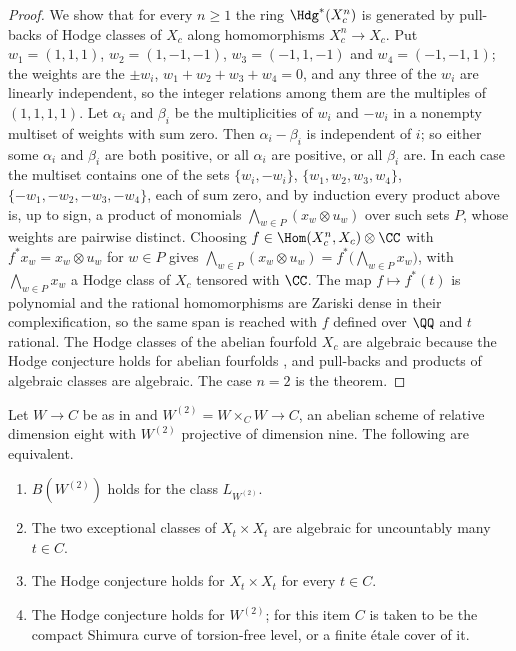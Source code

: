 \begin{proof}
We show that for every $n\ge1$ the ring $\Hdg^{*}(X_{c}^{n})$ is generated by
pull-backs of Hodge classes of $X_{c}$ along homomorphisms $X_{c}^{n}\to
X_{c}$. Put $w_{1}=(1,1,1)$, $w_{2}=(1,-1,-1)$, $w_{3}=(-1,1,-1)$ and
$w_{4}=(-1,-1,1)$; the weights are the $\pm w_{i}$,
$w_{1}+w_{2}+w_{3}+w_{4}=0$, and any three of the $w_{i}$ are linearly
independent, so the integer relations among them are the multiples of
$(1,1,1,1)$. Let $\alpha_{i}$ and $\beta_{i}$ be the multiplicities of $w_{i}$
and $-w_{i}$ in a nonempty multiset of weights with sum zero. Then
$\alpha_{i}-\beta_{i}$ is independent of $i$; so either some $\alpha_{i}$ and
$\beta_{i}$ are both positive, or all $\alpha_{i}$ are positive, or all
$\beta_{i}$ are. In each case the multiset contains one of the sets
$\{w_{i},-w_{i}\}$, $\{w_{1},w_{2},w_{3},w_{4}\}$,
$\{-w_{1},-w_{2},-w_{3},-w_{4}\}$, each of sum zero, and by induction every
product above is, up to sign, a product of monomials
$\bigwedge_{w\in P}(x_{w}\otimes u_{w})$ over such sets $P$, whose weights are
pairwise distinct. Choosing $f\in\Hom(X_{c}^{n},X_{c})\otimes\CC$ with
$f^{*}x_{w}=x_{w}\otimes u_{w}$ for $w\in P$ gives
$\bigwedge_{w\in P}(x_{w}\otimes u_{w})=f^{*}\bigl(\bigwedge_{w\in P}x_{w}\bigr)$,
with $\bigwedge_{w\in P}x_{w}$ a Hodge class of $X_{c}$ tensored with $\CC$.
The map $f\mapsto f^{*}(t)$ is polynomial and the rational homomorphisms are
Zariski dense in their complexification, so the same span is reached with $f$
defined over $\QQ$ and $t$ rational. The Hodge classes of the abelian fourfold
$X_{c}$ are algebraic because the Hodge conjecture holds for abelian fourfolds
\cite{Mar25a}, and pull-backs and products of algebraic classes are
algebraic. The case $n=2$ is the theorem.
\end{proof}

\begin{corollary}\label{cor:mumfordequiv}
Let $W\to C$ be as in  and
$W^{(2)}=W\times_{C}W\to C$, an abelian scheme of relative dimension eight
with $W^{(2)}$ projective of dimension nine. The following are equivalent.
\begin{enumerate}[label=\textup{(\alph*)},leftmargin=2.6em,itemsep=2pt]
\item $B(W^{(2)})$ holds for the class $L_{W^{(2)}}$.
\item The two exceptional classes of $X_{t}\times X_{t}$ are algebraic for
  uncountably many $t\in C$.
\item The Hodge conjecture holds for $X_{t}\times X_{t}$ for every $t\in C$.
\item The Hodge conjecture holds for $W^{(2)}$; for this item $C$ is taken to
  be the compact Shimura curve of torsion-free level, or a finite \'etale
  cover of it.
\end{enumerate}
\end{corollary}

